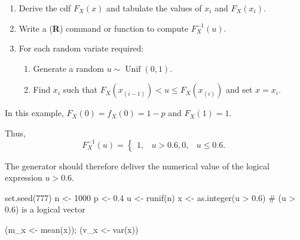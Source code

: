 \documentclass[
  letterpaper,
  DIV=11,
  numbers=noendperiod]{scrreprt}
\newenvironment{Shaded}{\begin{snugshade}}{\end{snugshade}}
\newcommand{\CommentTok}[1]{\textcolor[rgb]{0.37,0.37,0.37}{#1}}
\newcommand{\DecValTok}[1]{\textcolor[rgb]{0.68,0.00,0.00}{#1}}
\newcommand{\FloatTok}[1]{\textcolor[rgb]{0.68,0.00,0.00}{#1}}
\newcommand{\FunctionTok}[1]{\textcolor[rgb]{0.28,0.35,0.67}{#1}}
\newcommand{\NormalTok}[1]{\textcolor[rgb]{0.00,0.23,0.31}{#1}}
\newcommand{\OtherTok}[1]{\textcolor[rgb]{0.00,0.23,0.31}{#1}}
\newcommand{\SpecialCharTok}[1]{\textcolor[rgb]{0.37,0.37,0.37}{#1}}
\providecommand{\tightlist}{%
  \setlength{\itemsep}{0pt}\setlength{\parskip}{0pt}}
\begin{document}
\begin{tcolorbox}[enhanced jigsaw, colback=white, bottomtitle=1mm, breakable, arc=.35mm, colbacktitle=quarto-callout-note-color!10!white, colframe=quarto-callout-note-color-frame, titlerule=0mm, toptitle=1mm, leftrule=.75mm, bottomrule=.15mm, opacitybacktitle=0.6, left=2mm, toprule=.15mm, coltitle=black, rightrule=.15mm, title=\textcolor{quarto-callout-note-color}{\faInfo}\hspace{0.5em}{Procedure with ITM for discrete case}, opacityback=0]

\begin{enumerate}
\def\labelenumi{\arabic{enumi}.}
\item
  Derive the cdf \(F_X(x)\) and tabulate the values of \(x_i\) and
  \(F_X(x_i)\).
\item
  Write a (\textbf{R}) command or function to compute \(F_X^{-1}(u)\).
\item
  For each random variate required:

  \begin{enumerate}
  \def\labelenumii{\roman{enumii})}
  \tightlist
  \item
    Generate a random \(u\sim \operatorname{Unif}(0,1)\).
  \item
    Find \(x_i\) such that \(F_X(x_{(i-1)}) < u \leq F_X(x_{(i)})\) and
    set \(x = x_i\).
  \end{enumerate}
\end{enumerate}

\end{tcolorbox}

In this example, \(F_X(0) = f_X(0) = 1 - p\) and \(F_X(1) = 1\).

Thus, \[
F_X^{-1}(u) = 
\begin{cases}
1, & u > 0.6,
0, & u \leq 0.6.
\end{cases}
\]

The generator should therefore deliver the numerical value of the
logical expression \(u > 0.6\).

\begin{Shaded}
\begin{Highlighting}[]
\FunctionTok{set.seed}\NormalTok{(}\DecValTok{777}\NormalTok{)}
\NormalTok{n }\OtherTok{\textless{}{-}} \DecValTok{1000}
\NormalTok{p }\OtherTok{\textless{}{-}} \FloatTok{0.4}
\NormalTok{u }\OtherTok{\textless{}{-}} \FunctionTok{runif}\NormalTok{(n)}
\NormalTok{x }\OtherTok{\textless{}{-}} \FunctionTok{as.integer}\NormalTok{(u }\SpecialCharTok{\textgreater{}} \FloatTok{0.6}\NormalTok{)  }\CommentTok{\# (u \textgreater{} 0.6) is a logical vector}

\NormalTok{(m\_x }\OtherTok{\textless{}{-}} \FunctionTok{mean}\NormalTok{(x));  (v\_x }\OtherTok{\textless{}{-}} \FunctionTok{var}\NormalTok{(x))}
\end{Highlighting}
\end{Shaded}
\end{document}
